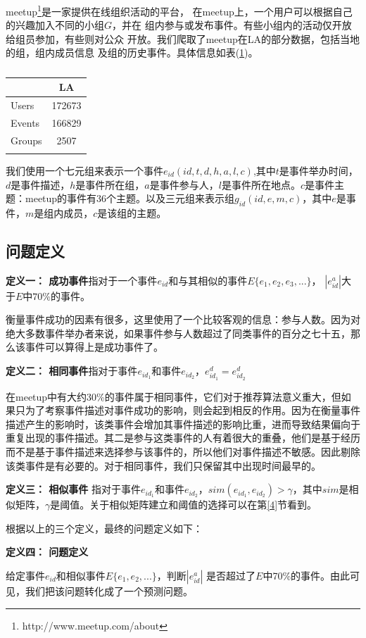 meetup\footnote{http://www.meetup.com/about}是一家提供在线组织活动的平台，
在meetup上，一个用户可以根据自己的兴趣加入不同的小组\(G\)，并在
组内参与或发布事件。有些小组内的活动仅开放给组员参加，有些则对公众
开放。我们爬取了meetup在LA的部分数据，包括当地的组，组内成员信息
及组的历史事件。具体信息如表(\ref{t1})。

\begin{longtable}[HTBP]{@{}lc@{}}
\toprule
& LA\tabularnewline
\midrule
\endhead
Users & 172673\tabularnewline
Events & 166829\tabularnewline
Groups & 2507\tabularnewline
\bottomrule
\caption{}
\label{t1}
\end{longtable}

我们使用一个七元组来表示一个事件\(e_{id}(id,t,d,h,a,l,c)\),其中\(t\)是事件举办时间，\(d\)是事件描述，\(h\)是事件所在组，\(a\)是事件参与人，\(l\)是事件所在地点。\(c\)是事件主题：meetup的事件有36个主题。以及三元组来表示组\(g_{id}(id,e,m,c)\)，其中\(e\)是事件，\(m\)是组内成员，\(c\)是该组的主题。

\subsection{问题定义}
\textbf{定义一： 成功事件}指对于一个事件\(e_{id}\)和与其相似的事件\(E\{e_1,e_2,e_3,...\}\)，
\(|e_{id}^a|\)大于\(E\)中\(70\)\%的事件。

衡量事件成功的因素有很多，这里使用了一个比较客观的信息：参与人数。因为对绝大多数事件举办者来说，如果事件参与人数超过了同类事件的百分之七十五，那么该事件可以算得上是成功事件了。

\textbf{定义二： 相同事件}指对于事件\(e_{id_1}\)和事件\(e_{id_2}\)，\(e_{id_1}^d=e_{id_2}^d\)

在meetup中有大约30\%的事件属于相同事件，它们对于推荐算法意义重大，但如果只为了考察事件描述对事件成功的影响，则会起到相反的作用。因为在衡量事件描述产生的影响时，该类事件会增加其事件描述的影响比重，进而导致结果偏向于重复出现的事件描述。其二是参与这类事件的人有着很大的重叠，他们是基于经历而不是基于事件描述来选择参与该事件的，所以他们对事件描述不敏感。因此剔除该类事件是有必要的。对于相同事件，我们只保留其中出现时间最早的。

\textbf{定义三： 相似事件}
指对于事件\(e_{id_1}\)和事件\(e_{id_2}\)，\(sim(e_{id_1},e_{id_2})>\gamma\)，其中\(sim\)是相似矩阵，\(\gamma\)是阈值。关于相似矩阵建立和阈值的选择可以在第\ref{4}节看到。

根据以上的三个定义，最终的问题定义如下：

\textbf{定义四： 问题定义}

给定事件\(e_{id}\)和相似事件\(E\{e_1,e_2,...\}\)，判断\(|e_{id}^a|\)
是否超过了\(E\)中70\%的事件。由此可见，我们把该问题转化成了一个预测问题。

